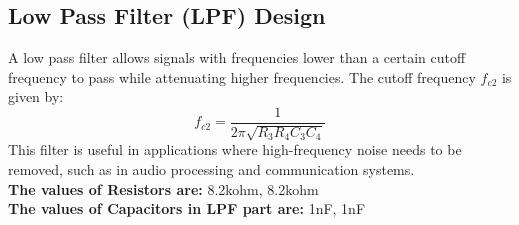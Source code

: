 \documentclass[a4paper,12pt]{article}
\begin{document}
\subsection{Low Pass Filter (LPF) Design}
A low pass filter allows signals with frequencies lower than a certain cutoff frequency to pass while attenuating higher frequencies. The cutoff frequency $f_{c2}$ is given by:
\begin{equation}
    f_{c2} = \frac{1}{2\pi \sqrt{R_3 R_4 C_3 C_4}}
\end{equation}
This filter is useful in applications where high-frequency noise needs to be removed, such as in audio processing and communication systems.\\
\textbf{The values of Resistors are:} 8.2kohm, 8.2kohm\\
\textbf{The values of Capacitors in LPF part are:} 1nF, 1nF \\
\begin{figure}[H]
    \centering
    \hfill
\end{figure}
\end{document}
